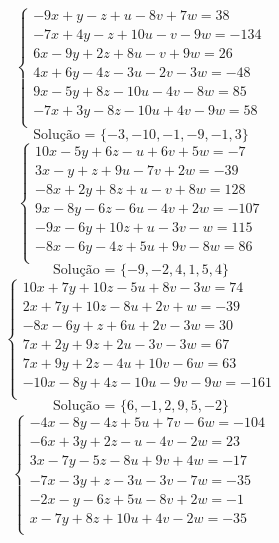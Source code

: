 \documentclass[12pt,oneside,a4paper]{article}
\begin{document}
\vspace{\baselineskip}
\begin{equation*}
\begin{cases}
-9x+y-z+u-8v+7w=38 \\
-7x+4y-z+10u-v-9w=-134 \\
6x-9y+2z+8u-v+9w=26 \\
4x+6y-4z-3u-2v-3w=-48 \\
9x-5y+8z-10u-4v-8w=85 \\
-7x+3y-8z-10u+4v-9w=58 \\
\end{cases}
\end{equation*}
\begin{equation*}
\text{Solução = }\{-3,-10,-1,-9,-1,3\}
\end{equation*}
\vspace{\baselineskip}
\begin{equation*}
\begin{cases}
10x-5y+6z-u+6v+5w=-7 \\
3x-y+z+9u-7v+2w=-39 \\
-8x+2y+8z+u-v+8w=128 \\
9x-8y-6z-6u-4v+2w=-107 \\
-9x-6y+10z+u-3v-w=115 \\
-8x-6y-4z+5u+9v-8w=86 \\
\end{cases}
\end{equation*}
\begin{equation*}
\text{Solução = }\{-9,-2,4,1,5,4\}
\end{equation*}
\vspace{\baselineskip}
\begin{equation*}
\begin{cases}
10x+7y+10z-5u+8v-3w=74 \\
2x+7y+10z-8u+2v+w=-39 \\
-8x-6y+z+6u+2v-3w=30 \\
7x+2y+9z+2u-3v-3w=67 \\
7x+9y+2z-4u+10v-6w=63 \\
-10x-8y+4z-10u-9v-9w=-161 \\
\end{cases}
\end{equation*}
\begin{equation*}
\text{Solução = }\{6,-1,2,9,5,-2\}
\end{equation*}
\vspace{\baselineskip}
\begin{equation*}
\begin{cases}
-4x-8y-4z+5u+7v-6w=-104 \\
-6x+3y+2z-u-4v-2w=23 \\
3x-7y-5z-8u+9v+4w=-17 \\
-7x-3y+z-3u-3v-7w=-35 \\
-2x-y-6z+5u-8v+2w=-1 \\
x-7y+8z+10u+4v-2w=-35 \\
\end{cases}
\end{equation*}
\end{document}
